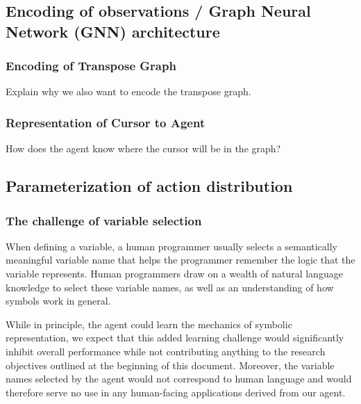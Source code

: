 \documentclass{article}
\begin{document}
\subsection{Encoding of observations / Graph Neural Network (GNN) architecture}
\hspace{Describe how the agent will encode the AST using a GNN. Give details on how the agent will differentiate the children of a node.}

\subsubsection{Encoding of Transpose Graph}
\hspace{16}Explain why we also want to encode the transpose graph.

\subsubsection{Representation of Cursor to Agent}
\hspace{16}How does the agent know where the cursor will be in the graph?

\subsection{Parameterization of action distribution}
\label{sec:parameterization}
\subsubsection{The challenge of variable selection}
\hspace{16}When defining a variable, a human programmer usually selects a semantically meaningful variable name that helps the programmer remember the logic that the variable represents. Human programmers draw on a wealth of natural language knowledge to select these variable names, as well as an understanding of how symbols work in general.

\hspace{16}While in principle, the agent could learn the mechanics of symbolic representation, we expect that this added learning challenge would significantly inhibit overall performance while not contributing anything to the research objectives outlined at the beginning of this document. Moreover, the variable names selected by the agent would not correspond to human language and would therefore serve no use in any human-facing applications derived from our agent.
\end{document}
